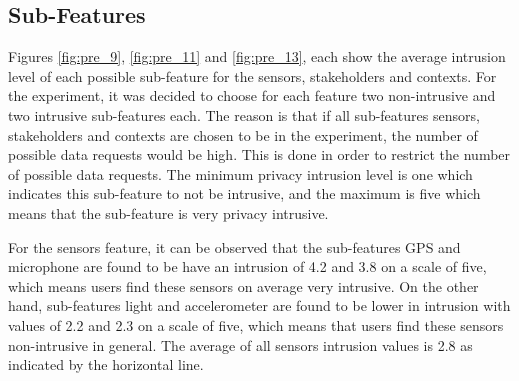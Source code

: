 \subsection{Sub-Features}

%
%


Figures \ref{fig:pre_9}, \ref{fig:pre_11} and \ref{fig:pre_13}, each show the average intrusion level of each possible sub-feature for
the sensors, stakeholders and contexts. For the experiment, it was decided to choose for each feature two non-intrusive and two intrusive sub-features
each. The reason is that if all sub-features sensors, stakeholders and contexts are chosen to be in the experiment, the number of possible data requests would be high. This is done in order to restrict the number of possible data requests. The minimum privacy intrusion level is one which indicates this sub-feature to not be intrusive, and the maximum is five which means that the sub-feature is very privacy intrusive.

For the sensors feature, it can be observed that the sub-features GPS and microphone are found to be have an intrusion of 4.2 and 3.8 on a scale of five, which means users find these sensors on average very intrusive. On the other hand, sub-features light and accelerometer are found to be lower in intrusion with values of 2.2 and 2.3 on a scale of five, which means that users find these sensors non-intrusive in general. The average of all sensors intrusion values is 2.8 as indicated by the horizontal line.

